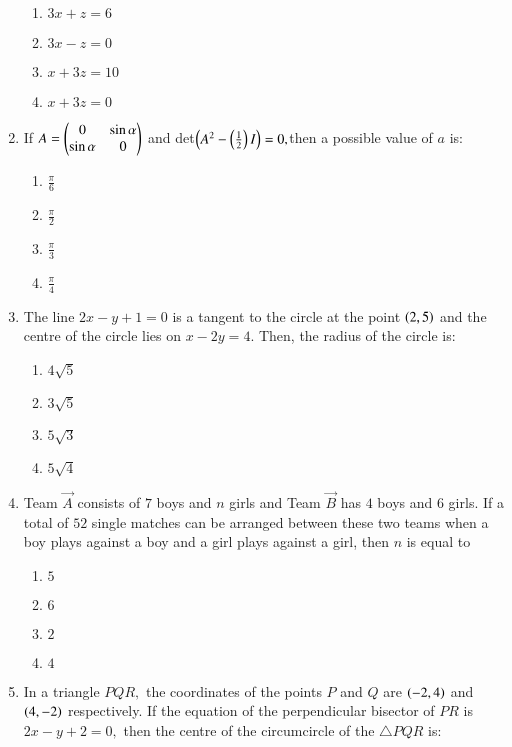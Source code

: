 \documentclass[journal,12pt,twocolumn]{IEEEtran}
\theoremstyle{remark}
\begin{document}
\begin{enumerate}
\begin{enumerate}
        \item $3x+z=6$
        \item $3x-z=0$
        \item $x+3z=10$
        \item $x+3z=0$\\
    \end{enumerate}
    \item If $A=\begin{pmatrix}0&\sin\alpha\\\sin\alpha&0\end{pmatrix}$ and det$\left(A^2-\left(\frac{1}{2}\right)I\right)=0,$then a possible value of $a$ is:
   \begin{enumerate}
        \item $\frac{\pi}{6}$
        \item $\frac{\pi}{2}$
        \item $\frac{\pi}{3}$
        \item $\frac{\pi}{4}$\\
    \end{enumerate}
    \item The line $2x-y+1=0$ is a tangent to the circle at the point $\left(2, 5\right)$ and the centre of the circle lies on $x-2y=4.$ Then, the radius of the circle is:
    \begin{enumerate}
        \item $4\sqrt{5}$
        \item $3\sqrt{5}$
        \item $5\sqrt{3}$
        \item $5\sqrt{4}$\\
    \end{enumerate}
    \item Team $\Vec{A}$ consists of $7$ boys and $n$ girls and Team $\Vec{B}$ has $4$ boys and $6$ girls. If a total of $52$ single matches can be arranged between these two teams when a boy plays against a boy and a girl plays against a girl, then $n$ is equal to
    \begin{enumerate}
        \item $5$
        \item $6$
        \item $2$
        \item $4$\\
    \end{enumerate}
    \item In a triangle $PQR,$ the coordinates of the points $P$ and $Q$ are $\left(-2, 4\right)$ and $\left(4, -2\right)$ respectively. If the equation of the perpendicular bisector of $PR$ is $2x-y+2=0,$ then the centre of the circumcircle of the $\triangle PQR$ is:

\end{enumerate}
\end{document}
